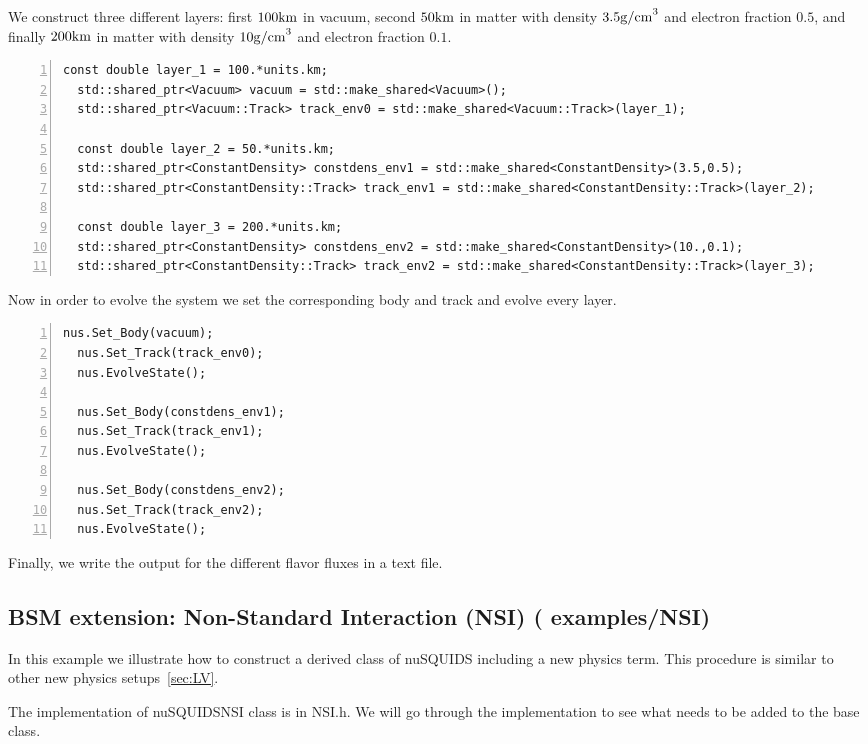 \documentclass[3p,12pt]{elsarticle}
\newcommand{\ttf}{\ttfamily}
\begin{document}
We construct three different layers: first $100{\rm km}$ in
vacuum, second $50{\rm km}$ in matter with density $3.5{\rm g/cm}^3$ and
 electron fraction $0.5$, and finally $200{\rm km}$ in matter with
 density $10{\rm g/cm}^3$ and electron fraction $0.1$.
 
\begin{lstlisting}[frame=leftline, numbers =
  left,breaklines=true,label = ex:sin1]
  const double layer_1 = 100.*units.km;
  std::shared_ptr<Vacuum> vacuum = std::make_shared<Vacuum>();
  std::shared_ptr<Vacuum::Track> track_env0 = std::make_shared<Vacuum::Track>(layer_1);

  const double layer_2 = 50.*units.km;
  std::shared_ptr<ConstantDensity> constdens_env1 = std::make_shared<ConstantDensity>(3.5,0.5); 
  std::shared_ptr<ConstantDensity::Track> track_env1 = std::make_shared<ConstantDensity::Track>(layer_2);

  const double layer_3 = 200.*units.km;
  std::shared_ptr<ConstantDensity> constdens_env2 = std::make_shared<ConstantDensity>(10.,0.1);
  std::shared_ptr<ConstantDensity::Track> track_env2 = std::make_shared<ConstantDensity::Track>(layer_3);
\end{lstlisting}

Now in order to evolve the system we set the corresponding body
and track and evolve every layer.

\begin{lstlisting}[frame=leftline, numbers =
  left,breaklines=true,label = ex:sin1]
  nus.Set_Body(vacuum);
  nus.Set_Track(track_env0);
  nus.EvolveState();

  nus.Set_Body(constdens_env1);
  nus.Set_Track(track_env1);
  nus.EvolveState();

  nus.Set_Body(constdens_env2);
  nus.Set_Track(track_env2);
  nus.EvolveState();
\end{lstlisting}

Finally, we write the output for the different flavor fluxes in a text file.


\subsection{BSM extension: Non-Standard  Interaction (NSI) \textnormal{({\ttf
      examples/NSI})}}
\label{sec:NSI}
In this example we illustrate how to construct a derived class of
{\ttf nuSQUIDS} including a new physics term. This procedure is similar to
other new physics setups~\ref{sec:LV}.

The implementation of {\ttf nuSQUIDSNSI} class is in {\ttf NSI.h}.
We will go through the implementation to see what needs to be
added to the base class.
\end{document}
